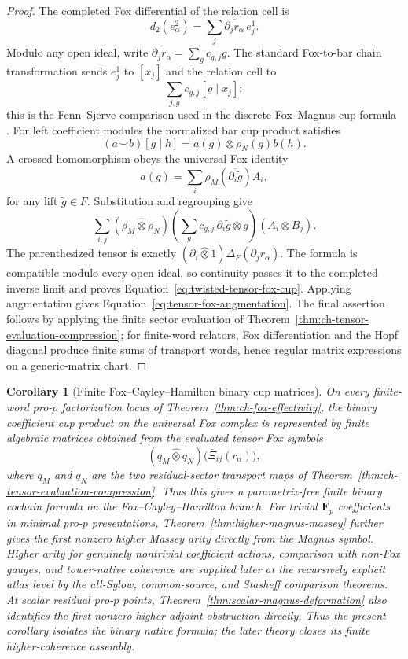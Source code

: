 \documentclass[11pt]{article}
\newtheorem{corollary}[theorem]{Corollary}
\theoremstyle{definition}
\begin{document}
\begin{proof}
The completed Fox differential of the relation cell is
\[
 d_2(e^2_\alpha)=
 \sum_j \overline{\partial_j r_\alpha}\,e^1_j.
\]
Modulo any open ideal, write
$\overline{\partial_j r_\alpha}=\sum_g c_{g,j}g$.
The standard Fox-to-bar chain transformation sends
$e^1_j$ to $[x_j]$ and the relation cell to
\[
 \sum_{j,g}c_{g,j}[g\mid x_j];
\]
this is the Fenn--Sjerve comparison used in the discrete Fox--Magnus cup
formula \cite{SuciuWangCup}.  For left coefficient modules the normalized bar
cup product satisfies
\[
 (a\smile b)[g\mid h]
 =a(g)\otimes \rho_N(g)b(h).
\]
A crossed homomorphism obeys the universal Fox identity
\[
 a(g)=\sum_i\rho_M(\overline{\partial_i\widetilde g})A_i,
\]
for any lift $\widetilde g\in F$.  Substitution and regrouping give
\[
 \sum_{i,j}
 (\rho_M\widehat\otimes\rho_N)
 \left(
 \sum_g c_{g,j}\,
 \partial_i\widetilde g\otimes g
 \right)
 (A_i\otimes B_j).
\]
The parenthesized tensor is exactly
$(\partial_i\widehat\otimes1)\Delta_F(\partial_jr_\alpha)$.
The formula is compatible modulo every open ideal, so continuity passes it to
the completed inverse limit and proves
Equation~\eqref{eq:twisted-tensor-fox-cup}.
Applying augmentation gives
Equation~\eqref{eq:tensor-fox-augmentation}.  The final assertion follows by
applying the finite sector evaluation of
Theorem~\ref{thm:ch-tensor-evaluation-compression}; for finite-word relators,
Fox differentiation and the Hopf diagonal produce finite sums of transport
words, hence regular matrix expressions on a generic-matrix chart.
\end{proof}

\begin{corollary}[Finite Fox--Cayley--Hamilton binary cup matrices]\label{cor:fox-ch-binary-cup}
On every finite-word pro-$p$ factorization locus of
Theorem~\ref{thm:ch-fox-effectivity}, the binary coefficient cup product on the
universal Fox complex is represented by finite algebraic matrices obtained
from the evaluated tensor Fox symbols
\[
 (q_M\widehat\otimes q_N)
 \bigl(\overline{\Xi}_{ij}(r_\alpha)\bigr),
\]
where $q_M$ and $q_N$ are the two residual-sector transport maps of
Theorem~\ref{thm:ch-tensor-evaluation-compression}.  Thus this gives a
parametrix-free finite binary cochain formula on the Fox--Cayley--Hamilton
branch.  For trivial $\mathbf F_p$ coefficients in minimal pro-$p$ presentations,
Theorem~\ref{thm:higher-magnus-massey} further gives the first nonzero higher
Massey arity directly from the Magnus symbol.  Higher arity for genuinely nontrivial coefficient actions, comparison with
non-Fox gauges, and tower-native coherence are supplied later at the recursively
explicit atlas level by the all-Sylow, common-source, and Stasheff comparison
theorems.  At scalar residual pro-$p$ points,
Theorem~\ref{thm:scalar-magnus-deformation} also identifies the first nonzero
higher adjoint obstruction directly.  Thus the present corollary isolates the
binary native formula; the later theory closes its finite higher-coherence
assembly.
\end{corollary}
\end{document}
